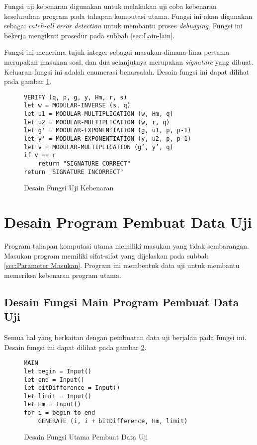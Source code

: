 Fungsi uji kebenaran digunakan untuk melakukan uji coba kebenaran keseluruhan program pada tahapan komputasi utama. Fungsi ini akan digunakan sebagai \textit{catch-all error detection} untuk membantu proses \textit{debugging}. Fungsi ini bekerja mengikuti prosedur pada subbab \ref{sec:Lain-lain}.

Fungsi ini menerima tujuh integer sebagai masukan dimana lima pertama merupakan masukan soal, dan dua selanjutnya merupakan \textit{signature} yang dibuat. Keluaran fungsi ini adalah enumerasi benar\textendash salah. Desain fungsi ini dapat dilihat pada gambar \ref{psdo:verify}.
\begin{figure}[h!]
\begin{lstlisting}[firstnumber=0]
VERIFY (q, p, g, y, Hm, r, s)
let w = MODULAR-INVERSE (s, q)
let u1 = MODULAR-MULTIPLICATION (w, Hm, q)
let u2 = MODULAR-MULTIPLICATION (w, r, q)
let g' = MODULAR-EXPONENTIATION (g, u1, p, p-1)
let y' = MODULAR-EXPONENTIATION (y, u2, p, p-1)
let v = MODULAR-MULTIPLICATION (g’, y’, q)
if v == r
	return "SIGNATURE CORRECT"
return "SIGNATURE INCORRECT"
\end{lstlisting}
\caption{Desain Fungsi Uji Kebenaran}
\label{psdo:verify}
\end{figure}

\section{Desain Program Pembuat Data Uji}

Program tahapan komputasi utama memiliki masukan yang tidak sembarangan. Masukan program memiliki sifat-sifat yang dijelaskan pada subbab \ref{sec:Parameter Masukan}. Program ini membentuk data uji untuk membantu memeriksa kebenaran program utama.

\subsection{Desain Fungsi Main Program Pembuat Data Uji}

Semua hal yang berkaitan dengan pembuatan data uji berjalan pada fungsi ini. Desain fungsi ini dapat dilihat pada gambar \ref{psdo:main_generator}.

\begin{figure}[h!]
\begin{lstlisting}[firstnumber=0]
MAIN
let begin = Input()
let end = Input()
let bitDifference = Input()
let limit = Input()
let Hm = Input()
for i = begin to end
	GENERATE (i, i + bitDifference, Hm, limit)
\end{lstlisting}
\caption{Desain Fungsi Utama Pembuat Data Uji}
\label{psdo:main_generator}
\end{figure}

